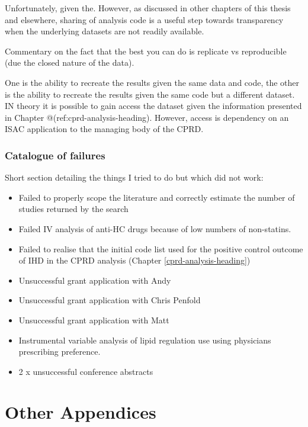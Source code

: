 \documentclass[a4paper, twoside]{templates/ociamthesis}
\begin{document}
Unfortunately, given the. However, as discussed in other chapters of this thesis and elsewhere, sharing of analysis code is a useful step towards transparency when the underlying datasets are not readily available.

Commentary on the fact that the best you can do is replicate vs reproducible (due the closed nature of the data).

One is the ability to recreate the results given the same data and code, the other is the ability to recreate the results given the same code but a different dataset. IN theory it is possible to gain access the dataset given the information presented in Chapter @(ref:cprd-analysis-heading). However, access is dependency on an ISAC application to the managing body of the CPRD.

\hypertarget{appendix-catalogue-failures}{%
\subsection{Catalogue of failures}\label{appendix-catalogue-failures}}

Short section detailing the things I tried to do but which did not work:

\begin{itemize}
\item
  Failed to properly scope the literature and correctly estimate the number of studies returned by the search
\item
  Failed IV analysis of anti-HC drugs because of low numbers of non-statins.
\item
  Failed to realise that the initial code list used for the positive control outcome of IHD in the CPRD analysis (Chapter \ref{cprd-analysis-heading})
\item
  Unsuccessful grant application with Andy
\item
  Unsuccessful grant application with Chris Penfold
\item
  Unsuccessful grant application with Matt
\item
  Instrumental variable analysis of lipid regulation use using physicians prescribing preference.
\item
  2 x unsuccessful conference abstracts
\end{itemize}

\hypertarget{other-appendix-heading}{%
\chapter{Other Appendices}\label{other-appendix-heading}}
\end{document}

